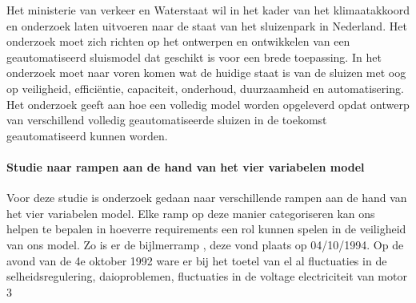 Het ministerie van verkeer en Waterstaat wil in het kader van het klimaatakkoord en onderzoek laten uitvoeren naar de staat van het sluizenpark in Nederland. Het onderzoek moet zich richten op het ontwerpen en ontwikkelen van een geautomatiseerd sluismodel dat geschikt is voor een brede toepassing. In het onderzoek moet naar voren komen wat de huidige staat is van de sluizen met oog op veiligheid, efficiëntie, capaciteit, onderhoud, duurzaamheid en automatisering. Het onderzoek geeft aan hoe een volledig model worden opgeleverd opdat ontwerp van verschillend volledig geautomatiseerde sluizen in de toekomst geautomatiseerd kunnen worden.  


\paragraph{Studie naar rampen aan de hand van het vier variabelen model}
\newline \indent Voor deze studie is onderzoek gedaan naar verschillende rampen aan de hand van het vier variabelen model.
Elke ramp op deze manier categoriseren  kan ons helpen te bepalen in hoeverre requirements een rol kunnen spelen in de veiligheid van ons model.  Zo is er de bijlmerramp \cite{aviationsafety04101992airplaneCrashBijlmer}
, deze vond plaats op 04/10/1994. 
Op de avond van de 4e oktober 1992 ware er bij het toetel van el al fluctuaties in de selheidsregulering, daioproblemen, fluctuaties in de voltage electriciteit van motor 3
